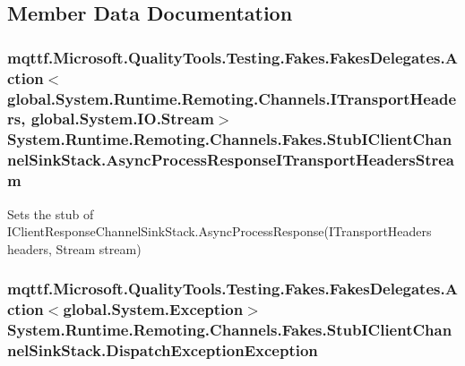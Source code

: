 \subsection{Member Data Documentation}
\hypertarget{class_system_1_1_runtime_1_1_remoting_1_1_channels_1_1_fakes_1_1_stub_i_client_channel_sink_stack_a260e09d71f6cb9fe18e4d3cddecf14cb}{
\subsubsection[{Async\-Process\-Response\-I\-Transport\-Headers\-Stream}]{\setlength{\rightskip}{0pt plus 5cm}mqttf.\-Microsoft.\-Quality\-Tools.\-Testing.\-Fakes.\-Fakes\-Delegates.\-Action$<$global.\-System.\-Runtime.\-Remoting.\-Channels.\-I\-Transport\-Headers, global.\-System.\-I\-O.\-Stream$>$ System.\-Runtime.\-Remoting.\-Channels.\-Fakes.\-Stub\-I\-Client\-Channel\-Sink\-Stack.\-Async\-Process\-Response\-I\-Transport\-Headers\-Stream}}\label{class_system_1_1_runtime_1_1_remoting_1_1_channels_1_1_fakes_1_1_stub_i_client_channel_sink_stack_a260e09d71f6cb9fe18e4d3cddecf14cb}


Sets the stub of I\-Client\-Response\-Channel\-Sink\-Stack.\-Async\-Process\-Response(\-I\-Transport\-Headers headers, Stream stream)

\hypertarget{class_system_1_1_runtime_1_1_remoting_1_1_channels_1_1_fakes_1_1_stub_i_client_channel_sink_stack_adc732ccc28a530decf48167548763c6a}{
\subsubsection[{Dispatch\-Exception\-Exception}]{\setlength{\rightskip}{0pt plus 5cm}mqttf.\-Microsoft.\-Quality\-Tools.\-Testing.\-Fakes.\-Fakes\-Delegates.\-Action$<$global.\-System.\-Exception$>$ System.\-Runtime.\-Remoting.\-Channels.\-Fakes.\-Stub\-I\-Client\-Channel\-Sink\-Stack.\-Dispatch\-Exception\-Exception}}\label{class_system_1_1_runtime_1_1_remoting_1_1_channels_1_1_fakes_1_1_stub_i_client_channel_sink_stack_adc732ccc28a530decf48167548763c6a}


